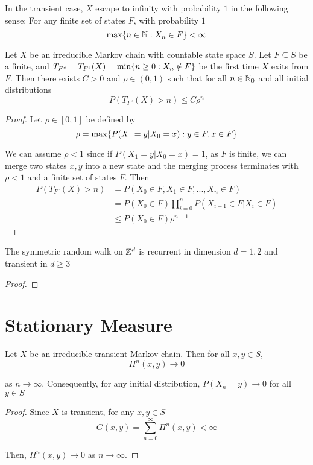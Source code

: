 \documentclass{report}
\begin{document}
\begin{remark}
    In the transient case, $X$ escape to infinity with probability $1$ in the following sense: For any finite set of states $F$, with probability $1$
    $$
        \max\{n \in \mathbb{N}: X_n \in F\} < \infty
    $$
\end{remark}

\begin{proposition}
    Let $X$ be an irreducible Markov chain with countable state space $S$. Let $F \subseteq S$ be a finite, and $T_{F^c} = T_{F^c}(X) = \min\{n \geq 0: X_n \notin F\}$ be the first time $X$ exits from $F$. Then there exists $C > 0$ and $\rho \in (0, 1)$ such that for all $n \in \mathbb{N}_0$ and all initial distributions
    $$
        P(T_{F^c}(X) > n) \leq C \rho^n
    $$
\begin{proof}
    Let $\rho \in [0, 1]$ be defined by
    $$
        \rho = \max \{P(X_1 = y | X_0 = x): y \in F, x \in F\}
    $$

    We can assume $\rho < 1$ since if $P(X_1 = y | X_0 = x) = 1$, as $F$ is finite, we can merge two states $x, y$ into a new state and the merging process terminates with $\rho < 1$ and a finite set of states $F$. Then
    \begin{align*}
        P(T_{F^c}(X) > n)
        &= P(X_0 \in F, X_1 \in F, ..., X_n \in F) \\
        &= P(X_0 \in F) \prod_{i=0}^n P(X_{i+1} \in F | X_i \in F) \\
        &\leq P(X_0 \in F) \rho^{n-1}
    \end{align*}
\end{proof}
\end{proposition}

\begin{theorem}[Pólya 1921]
    The symmetric random walk on $\mathbb{Z}^d$ is recurrent in dimension $d=1, 2$ and transient in $d \geq 3$
\begin{proof}
\end{proof}
\end{theorem}


\section{Stationary Measure}

\begin{proposition}
    Let $X$ be an irreducible transient Markov chain. Then for all $x, y \in S$,
    $$
        \Pi^n(x, y) \to 0
    $$

    as $n \to \infty$. Consequently, for any initial distribution, $P(X_n = y) \to 0$ for all $y \in S$
\begin{proof}
    Since $X$ is transient, for any $x, y \in S$
    $$
        G(x, y) = \sum_{n=0}^\infty \Pi^n(x, y) < \infty
    $$

    Then, $\Pi^n(x, y) \to 0$ as $n \to \infty$.
\end{proof}
\end{proposition}
\end{document}
